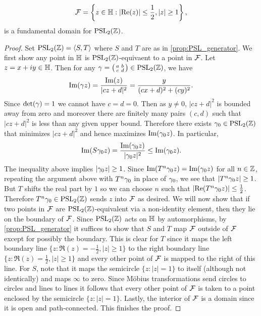       \begin{proposition}\label{prop:fundamental_domain_modular_group}
        \[
          \mathcal{F} = \left\{z \in \mathbb{H}:|\mathrm{Re}(z)| \le \frac{1}{2}, |z| \ge 1\right\},
        \]
        is a fundamental domain for $\mathrm{PSL}_{2}(\mathbb{Z})$.
      \end{proposition}
      \begin{proof}
        Set $\mathrm{PSL}_{2}(\mathbb{Z}) = \langle S,T\rangle$ where $S$ and $T$ are as in \cref{prop:PSL_generator}. We first show any point in $\mathbb{H}$ is $\mathrm{PSL}_{2}(\mathbb{Z})$-equivaent to a point in $\mathcal{F}$. Let $z = x+iy \in \mathbb{H}$. Then for any $\gamma = \begin{psmallmatrix} a & b \\ c & d \end{psmallmatrix} \in \mathrm{PSL}_{2}(\mathbb{Z})$, we have
        \[
          \mathrm{Im}(\gamma z) = \frac{\mathrm{Im}(z)}{|cz+d|^{2}} = \frac{y}{(cx+d)^{2}+(cy)^{2}}.
        \]
        Since $\det(\gamma) = 1$ we cannot have $c = d = 0$. Then as $y \neq 0$, $|cz+d|^{2}$ is bounded away from zero and moreover there are finitely many pairs $(c,d)$ such that $|cz+d|^{2}$ is less than any given upper bound. Therefore there exists $\gamma_{0} \in \mathrm{PSL}_{2}(\mathbb{Z})$ that minimizes $|cz+d|^{2}$ and hence maximizes $\mathrm{Im}(\gamma_{0}z)$. In particular,
        \[
          \mathrm{Im}(S\gamma_{0}z) = \frac{\mathrm{Im}(\gamma_{0}z)}{|\gamma_{0}z|^{2}} \le \mathrm{Im}(\gamma_{0}z).
        \]
        The inequality above implies $|\gamma_{0}z| \ge 1$. Since $\mathrm{Im}(T^{n}\gamma_{0}z) = \mathrm{Im}(\gamma_{0}z)$ for all $n \in \mathbb{Z}$, repeating the argument above with $T^{n}\gamma_{0}$ in place of $\gamma_{0}$, we see that $|T^{n}\gamma_{0}z| \ge 1$. But $T$ shifts the real part by $1$ so we can choose $n$ such that $|\mathrm{Re}(T^{n}\gamma_{0}z)| \le \frac{1}{2}$. Therefore $T^{n}\gamma_{0} \in \mathrm{PSL}_{2}(\mathbb{Z})$ sends $z$ into $\mathcal{F}$ as desired. We will now show that if two points in $\mathcal{F}$ are $\mathrm{PSL}_{2}(\mathbb{Z})$-equivalent via a non-identity element, then they lie on the boundary of $\mathcal{F}$. Since $\mathrm{PSL}_{2}(\mathbb{Z})$ acts on $\mathbb{H}$ by automorphisms, by \cref{prop:PSL_generator} it suffices to show that $S$ and $T$ map $\mathcal{F}$ outside of $\mathcal{F}$ except for possibly the boundary. This is clear for $T$ since it maps the left boundary line $\{z:\Re(z) = -\frac{1}{2},|z| \ge 1\}$ to the right boundary line $\{z:\Re(z) = \frac{1}{2},|z| \ge 1\}$ and every other point of $\mathcal{F}$ is mapped to the right of this line. For $S$, note that it maps the semicircle $\{z:|z| = 1\}$ to itself (although not identically) and maps $\infty$ to zero. Since M\"obius transformations send circles to circles and lines to lines it follows that every other point of $\mathcal{F}$ is taken to a point enclosed by the semicircle $\{z:|z| = 1\}$. Lastly, the interior of $\mathcal{F}$ is a domain since it is open and path-connected. This finishes the proof.
      \end{proof}

